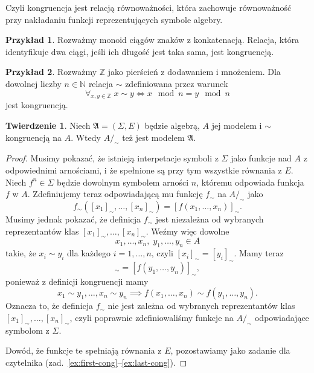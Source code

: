 \documentclass{book}
\theoremstyle{definition}
\newtheorem{example}{Przykład}[section]
\newtheorem{theorem}{Twierdzenie}[section]
\begin{document}
Czyli kongruencja jest relacją równoważności,
	która zachowuje równoważność przy nakładaniu funkcji reprezentujących symbole algebry.

\begin{example}
	Rozważmy monoid ciągów znaków z konkatenacją.
	Relacja, która identyfikuje dwa ciągi, jeśli ich długość jest taka sama,
		jest kongruencją.
\end{example}

\begin{example}
	Rozważmy $\mathbb{Z}$ jako pierścień z dodawaniem i mnożeniem.
	Dla dowolnej liczby $n \in \mathbb{N}$ relacja $\sim$ zdefiniowana przez warunek
	\begin{equation}
		\forall_{x, y \in \mathbb{Z}} \; x \sim y \iff x \mod n = y \mod n
	\end{equation}
	jest kongruencją.
\end{example}

\begin{theorem}\label{th:cong-model}
	Niech $\mathfrak{A} = (\Sigma, E)$ będzie algebrą,
		$A$ jej modelem i $\sim$ kongruencją na $A$.
	Wtedy $A/_\sim$ też jest modelem $\mathfrak{A}$.
\end{theorem}
\begin{proof}
	Musimy pokazać,
		że istnieją interpetacje symboli z $\Sigma$ jako funkcje nad $A$ z odpowiednimi
		arnościami,
		i że spełnione są przy tym wszystkie równania z $E$.
	Niech $f^n \in \Sigma$ będzie dowolnym symbolem arności $n$,
		któremu odpowiada funkcja $f$ w $A$.
	Zdefiniujemy teraz odpowiadającą mu funkcję $f_\sim$ na $A/_\sim$ jako
	\begin{equation}
		f_\sim([x_1]_\sim, \dots, [x_n]_\sim) = [f(x_1, \dots, x_n)]_\sim.
	\end{equation}
	Musimy jednak pokazać,
		że definicja $f_\sim$ jest niezależna od wybranych reprezentantów klas $[x_1]_\sim, \dots, [x_n]_\sim$.
	Weźmy więc dowolne
	\begin{equation}
		x_1, \dots, x_n,\;y_1, \dots, y_n \in A
	\end{equation}
		takie,
		że $x_i \sim y_i$ dla każdego $i = 1, \dots, n$,
		czyli $[x_i]_\sim = [y_i]_\sim$.
	Mamy teraz
	\begin{equation}
		[f(x_1, \dots, x_n)]_\sim = [f(y_1, \dots, y_n)]_\sim,
	\end{equation}
	ponieważ z definicji kongruencji mamy
	\begin{equation}
		x_1 \sim y_1, \dots, x_n \sim y_n \implies f(x_1, \dots, x_n) \sim f(y_1, \dots, y_n).
	\end{equation}
	Oznacza to,
		że definicja $f_\sim$ nie jest zależna od wybranych reprezentantów klas $[x_1]_\sim, \dots, [x_n]_\sim$,
	czyli poprawnie zdefiniowaliśmy funkcje na $A/_\sim$ odpowiadające symbolom z $\Sigma$.

	Dowód,
		że funkcje te spełniają równania z $E$,
		pozostawiamy jako zadanie dla czytelnika (zad.~\ref{ex:first-cong}--\ref{ex:last-cong}).
\end{proof}
\end{document}
